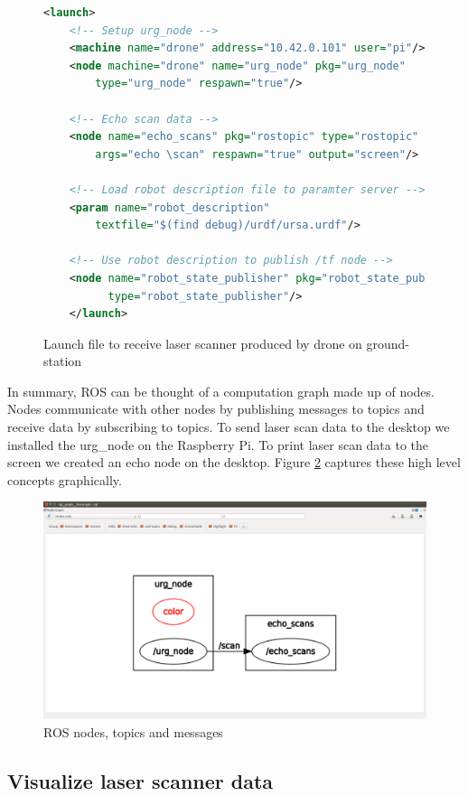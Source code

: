 \documentclass[capstone_report.tex]{subfiles}
\begin{document}
\begin{figure}[H]
    \centering
    \begin{lstlisting}[language=xml]
    <launch>
    <!-- Setup urg_node -->
    <machine name="drone" address="10.42.0.101" user="pi"/>
    <node machine="drone" name="urg_node" pkg="urg_node" 
        type="urg_node" respawn="true"/>

    <!-- Echo scan data -->
    <node name="echo_scans" pkg="rostopic" type="rostopic" 
        args="echo \scan" respawn="true" output="screen"/>

    <!-- Load robot description file to paramter server -->
    <param name="robot_description" 
        textfile="$(find debug)/urdf/ursa.urdf"/>

    <!-- Use robot description to publish /tf node -->
    <node name="robot_state_publisher" pkg="robot_state_publisher" 
          type="robot_state_publisher"/>
    </launch>
    \end{lstlisting}
    \caption{Launch file to receive laser scanner produced by drone on ground-station}
    \label{fig:launch_file}
\end{figure}

In summary, ROS can be thought of a computation graph made up of nodes.  Nodes communicate with other nodes by publishing messages to topics and receive data by subscribing to topics.  To send laser scan data to the desktop we installed the urg\_node on the Raspberry Pi.   To print laser scan data to the screen we created an echo node on the desktop.  Figure \ref{fig:ROS} captures these high level concepts graphically.

\begin{figure}[H]
    \centering
    \includegraphics[width=0.8\linewidth]{imgs/node_graph.png}
    \caption{ROS nodes, topics and messages}
    \label{fig:ROS}
\end{figure}

\subsection{Visualize laser scanner data}
\end{document}

